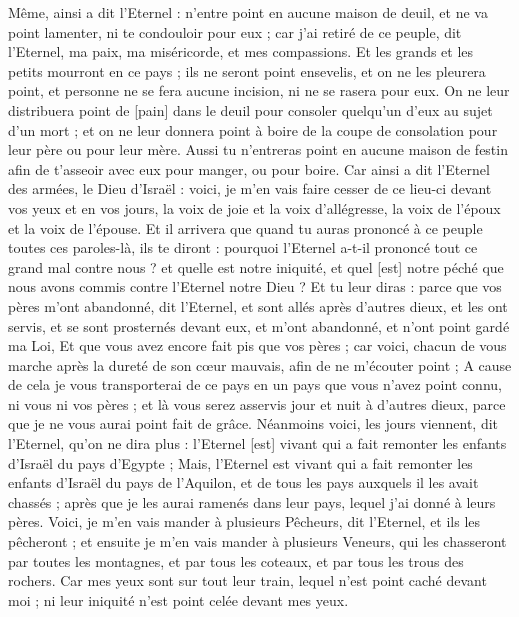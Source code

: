 \begin{multicols}{2}
Même, ainsi a dit l'Eternel : n'entre point en aucune maison de deuil, et ne va point lamenter, ni te condouloir pour eux ; car j'ai retiré de ce peuple, dit l'Eternel, ma paix, ma miséricorde, et mes compassions.
Et les grands et les petits mourront en ce pays ; ils ne seront point ensevelis, et on ne les pleurera point, et personne ne se fera aucune incision, ni ne se rasera pour eux.
On ne leur distribuera point de [pain] dans le deuil pour consoler quelqu'un d'eux au sujet d'un mort ; et on ne leur donnera point à boire de la coupe de consolation pour leur père ou pour leur mère.
Aussi tu n'entreras point en aucune maison de festin afin de t'asseoir avec eux pour manger, ou pour boire.
Car ainsi a dit l'Eternel des armées, le Dieu d'Israël : voici, je m'en vais faire cesser de ce lieu-ci devant vos yeux et en vos jours, la voix de joie et la voix d'allégresse, la voix de l'époux et la voix de l'épouse.
Et il arrivera que quand tu auras prononcé à ce peuple toutes ces paroles-là, ils te diront : pourquoi l'Eternel a-t-il prononcé tout ce grand mal contre nous ? et quelle est notre iniquité, et quel [est] notre péché que nous avons commis contre l'Eternel notre Dieu ?
Et tu leur diras : parce que vos pères m'ont abandonné, dit l'Eternel, et sont allés après d'autres dieux, et les ont servis, et se sont prosternés devant eux, et m'ont abandonné, et n'ont point gardé ma Loi,
Et que vous avez encore fait pis que vos pères ; car voici, chacun de vous marche après la dureté de son cœur mauvais, afin de ne m'écouter point ;
A cause de cela je vous transporterai de ce pays en un pays que vous n'avez point connu, ni vous ni vos pères ; et là vous serez asservis jour et nuit à d'autres dieux, parce que je ne vous aurai point fait de grâce.
Néanmoins voici, les jours viennent, dit l'Eternel, qu'on ne dira plus : l'Eternel [est] vivant qui a fait remonter les enfants d'Israël du pays d'Egypte ;
Mais, l'Eternel est vivant qui a fait remonter les enfants d'Israël du pays de l'Aquilon, et de tous les pays auxquels il les avait chassés ; après que je les aurai ramenés dans leur pays, lequel j'ai donné à leurs pères.
Voici, je m'en vais mander à plusieurs Pêcheurs, dit l'Eternel, et ils les pêcheront ; et ensuite je m'en vais mander à plusieurs Veneurs, qui les chasseront par toutes les montagnes, et par tous les coteaux, et par tous les trous des rochers.
Car mes yeux sont sur tout leur train, lequel n'est point caché devant moi ; ni leur iniquité n'est point celée devant mes yeux.

\end{multicols}
